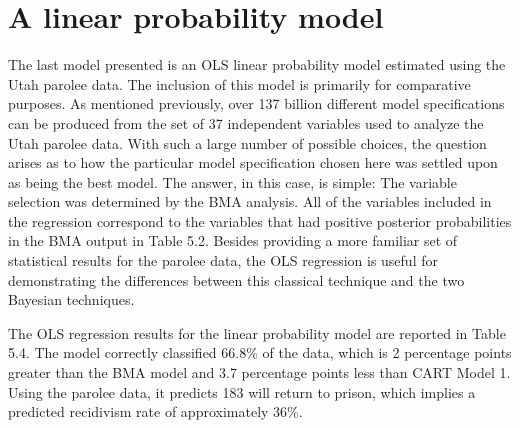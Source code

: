 \section{A linear probability model}

The last model presented is an OLS linear probability model estimated using the Utah parolee data.  The inclusion of this model is primarily for comparative purposes.  As mentioned previously, over 137 billion different model specifications can be produced from the set of 37 independent variables used to analyze the Utah parolee data.  With such a large number of possible choices, the question arises as to how the particular model specification chosen here was settled upon as being the best model.  The answer, in this case, is simple:  The variable selection was determined by the BMA analysis.  All of the variables included in the regression correspond to the variables that had positive posterior probabilities in the BMA output in Table 5.2.  Besides providing a more familiar set of statistical results for the parolee data, the OLS regression is useful for demonstrating the differences between this classical technique and the two Bayesian techniques.

The OLS regression results for the linear probability model are reported in Table 5.4.  The model correctly classified 66.8\% of the data, which is 2 percentage points greater than the BMA model and 3.7 percentage points less than CART Model 1.  Using the parolee data, it predicts 183 will return to prison, which implies a predicted recidivism rate of approximately 36\%.

